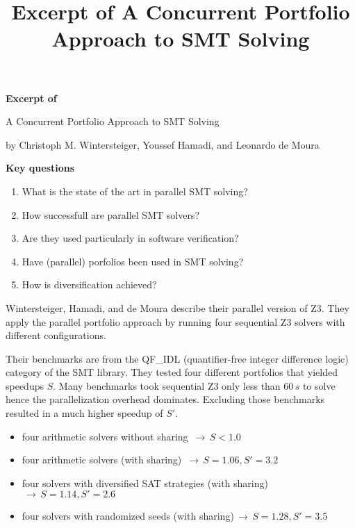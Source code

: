\documentclass{scrartcl}
\title{Excerpt of A Concurrent Portfolio Approach to SMT Solving}
\begin{document}
\begin{center}
    \Large{\textbf{Excerpt of}}

    \LARGE{A Concurrent Portfolio Approach to SMT Solving}

    \large{by Christoph M. Wintersteiger, Youssef Hamadi, and Leonardo de Moura}
\end{center}

\vspace{1cm}

\begin{addmargin}[0.2\linewidth]{0.2\linewidth}
    \begin{center}
        \textbf{Key questions}
    \end{center}
    \begin{enumerate}[i]
        \item What is the state of the art in parallel SMT solving?
        \item How successfull are parallel SMT solvers?
        \item Are they used particularly in software verification?
        \item Have (parallel) porfolios been used in SMT solving?
        \item How is diversification achieved?
    \end{enumerate}
\end{addmargin}

\vspace{1cm}

Wintersteiger, Hamadi, and de Moura describe their parallel version of Z3.
They apply the parallel portfolio approach by running four sequential Z3 solvers
with different configurations.

Their benchmarks are from the QF\_IDL (quantifier-free integer difference logic) category
of the SMT library.
They tested four different portfolios that yielded speedups \(S\).
Many benchmarks took sequential Z3 only less than \(60\, s\) to solve
hence the parallelization overhead dominates.
Excluding those benchmarks resulted in a much higher speedup of \(S'\).
\begin{itemize}
    \item four arithmetic solvers without sharing \(\,\to\, S < 1.0\)
    \item four arithmetic solvers (with sharing) \(\,\to\, S = 1.06, S' = 3.2\)
    \item four solvers with diversified SAT strategies (with sharing)
        \(\,\to\, S = 1.14, S' = 2.6\)
    \item four solvers with randomized seeds (with sharing)\(\,\to\, S = 1.28, S' = 3.5\)
\end{itemize}
\end{document}
